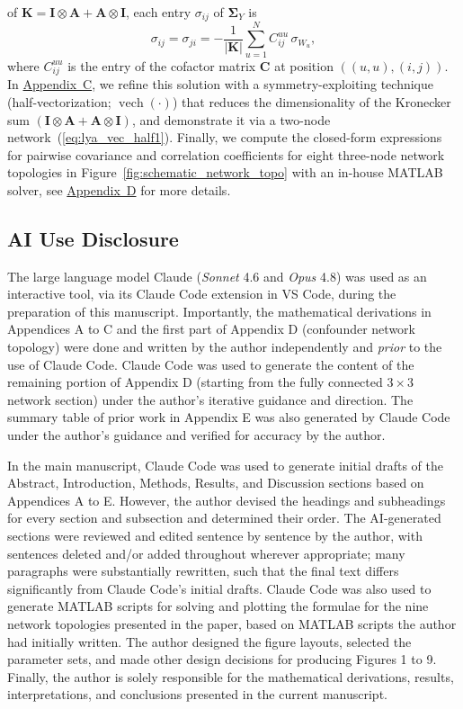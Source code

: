 \documentclass[12pt]{article}
\begin{document}
of $\mathbf{K}=\mathbf{I}\otimes\mathbf{A}
+\mathbf{A}\otimes\mathbf{I}$, each entry $\sigma_{ij}$
of $\mathbf{\Sigma}_Y$ is
\begin{equation}
\sigma_{ij}=\sigma_{ji}=
-\frac{1}{|\mathbf{K}|}
\sum_{u=1}^{N}
C_{ij}^{uu}\,\sigma_{W_{u}},
\label{eq:sigma_ij_general}
\end{equation}
where $C_{ij}^{uu}$ is the entry of the cofactor matrix $\mathbf{C}$ at
position $((u,u),(i,j))$. In \hyperref[app:appC]{Appendix~C}, we refine this solution with a
symmetry-exploiting technique (half-vectorization; $\operatorname{vech}(\cdot)$) that
reduces the dimensionality of the Kronecker sum $(\mathbf{I}\otimes\mathbf{A}+\mathbf{A}\otimes\mathbf{I})$, and demonstrate it via a
two-node network~(\ref{eq:lya_vec_half1}). Finally,
we compute the closed-form expressions for pairwise covariance and correlation coefficients for eight three-node
network topologies in Figure~\ref{fig:schematic_network_topo}
with an in-house MATLAB solver, see \hyperref[app:appD]{Appendix~D} for more details.


\subsection*{AI Use Disclosure}
The large language model Claude (\textit{Sonnet} 4.6 and \textit{Opus} 4.8) was used as an interactive tool, via its Claude Code extension in VS Code, during the preparation of this manuscript. Importantly, the mathematical derivations in Appendices A to C and the first part of Appendix D (confounder network topology) were done and written by the author independently and \textit{prior} to the use of Claude Code. Claude Code was used to generate the content of the remaining portion of Appendix D (starting from the fully connected $3\times3$ network section) under the author's iterative guidance and direction. The summary table of prior work in Appendix E was also generated by Claude Code under the author's guidance and verified for accuracy by the author.

In the main manuscript, Claude Code was used to generate initial drafts of the Abstract, Introduction, Methods, Results, and Discussion sections based on Appendices A to E. However, the author devised the headings and subheadings for every section and subsection and determined their order. The AI-generated sections were reviewed and edited sentence by sentence by the author, with sentences deleted and/or added throughout wherever appropriate; many paragraphs were substantially rewritten, such that the final text differs significantly from Claude Code's initial drafts. Claude Code was also used to generate MATLAB scripts for solving and plotting the formulae for the nine network topologies presented in the paper, based on MATLAB scripts the author had initially written. The author designed the figure layouts, selected the parameter sets, and made other design decisions for producing Figures 1 to 9. Finally, the author is solely responsible for the mathematical derivations, results, interpretations, and conclusions presented in the current manuscript.
\end{document}
